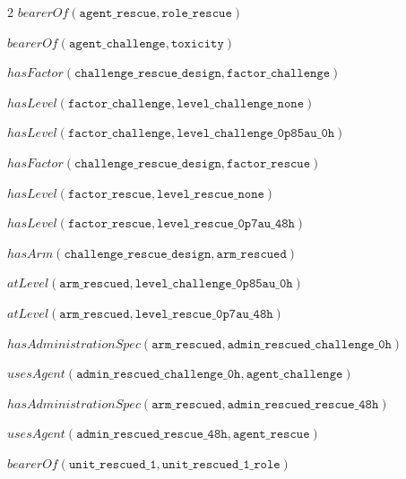\documentclass[10pt,a4paper]{article}
\begin{document}
{\begin{multicols}{2}
$\mathit{bearerOf}(\mathtt{agent\_\allowbreak{}rescue}, \mathtt{role\_\allowbreak{}rescue})$\par
$\mathit{bearerOf}(\mathtt{agent\_\allowbreak{}challenge}, \mathtt{toxicity})$\par
$\mathit{hasFactor}(\mathtt{challenge\_\allowbreak{}rescue\_\allowbreak{}design}, \mathtt{factor\_\allowbreak{}challenge})$\par
$\mathit{hasLevel}(\mathtt{factor\_\allowbreak{}challenge}, \mathtt{level\_\allowbreak{}challenge\_\allowbreak{}none})$\par
$\mathit{hasLevel}(\mathtt{factor\_\allowbreak{}challenge}, \mathtt{level\_\allowbreak{}challenge\_\allowbreak{}0p85au\_\allowbreak{}0h})$\par
$\mathit{hasFactor}(\mathtt{challenge\_\allowbreak{}rescue\_\allowbreak{}design}, \mathtt{factor\_\allowbreak{}rescue})$\par
$\mathit{hasLevel}(\mathtt{factor\_\allowbreak{}rescue}, \mathtt{level\_\allowbreak{}rescue\_\allowbreak{}none})$\par
$\mathit{hasLevel}(\mathtt{factor\_\allowbreak{}rescue}, \mathtt{level\_\allowbreak{}rescue\_\allowbreak{}0p7au\_\allowbreak{}48h})$\par
$\mathit{hasArm}(\mathtt{challenge\_\allowbreak{}rescue\_\allowbreak{}design}, \mathtt{arm\_\allowbreak{}rescued})$\par
$\mathit{atLevel}(\mathtt{arm\_\allowbreak{}rescued}, \mathtt{level\_\allowbreak{}challenge\_\allowbreak{}0p85au\_\allowbreak{}0h})$\par
$\mathit{atLevel}(\mathtt{arm\_\allowbreak{}rescued}, \mathtt{level\_\allowbreak{}rescue\_\allowbreak{}0p7au\_\allowbreak{}48h})$\par
$\mathit{hasAdministrationSpec}(\mathtt{arm\_\allowbreak{}rescued}, \mathtt{admin\_\allowbreak{}rescued\_\allowbreak{}challenge\_\allowbreak{}0h})$\par
$\mathit{usesAgent}(\mathtt{admin\_\allowbreak{}rescued\_\allowbreak{}challenge\_\allowbreak{}0h}, \mathtt{agent\_\allowbreak{}challenge})$\par
$\mathit{hasAdministrationSpec}(\mathtt{arm\_\allowbreak{}rescued}, \mathtt{admin\_\allowbreak{}rescued\_\allowbreak{}rescue\_\allowbreak{}48h})$\par
$\mathit{usesAgent}(\mathtt{admin\_\allowbreak{}rescued\_\allowbreak{}rescue\_\allowbreak{}48h}, \mathtt{agent\_\allowbreak{}rescue})$\par
$\mathit{bearerOf}(\mathtt{unit\_\allowbreak{}rescued\_\allowbreak{}1}, \mathtt{unit\_\allowbreak{}rescued\_\allowbreak{}1\_\allowbreak{}role})$\par

\end{multicols}}
\end{document}

